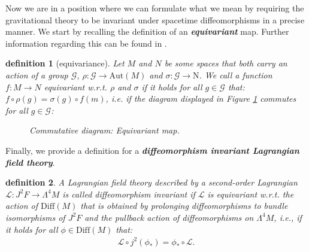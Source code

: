\documentclass[a4paper,12pt, DIV=14, BCOR=5mm, twoside, headsepline, numbers=noenddot]{scrbook}
\newtheorem{definition}{definition}[section]
\begin{document}
Now we are in a position where we can formulate what we mean by requiring the gravitational theory to be invariant under spacetime diffeomorphisms in a precise manner. We start by recalling the definition of an \textit{\textbf{equivariant}} map. Further information regarding this can be found in \cite{doi:10.1142/3867}.
\begin{definition}[equivariance]
Let $M$ and $N$ be some spaces that both carry an action of a group $\mathcal{G}$, $\rho : \mathcal{G} \rightarrow \mathrm{Aut}(M)$ and $\sigma : \mathcal{G} \rightarrow \mathrm{N}$. We call a function $f : M \rightarrow N$ equivariant w.r.t. $\rho$ and $\sigma$ if it holds for all $g \in \mathcal{G}$ that: $f \circ \rho(g) = \sigma(g) \circ f(m)$, i.e. if the diagram displayed in Figure \ref{EquiDia} commutes for all $g \in \mathcal{G}$:
\begin{figure}[hbt!]
\centering
{}
\caption{Commutative diagram: Equivariant map.}\label{EquiDia}
\end{figure}
\end{definition}
Finally, we provide a definition for a \textit{\textbf{diffeomorphism invariant Lagrangian field theory}}.
\begin{definition}
A Lagrangian field theory described by a second-order Lagrangian $\mathcal{L} : J^2F \rightarrow \Lambda^4 M$ is called diffeomorphism invariant if $\mathcal{L}$ is equivariant w.r.t. the action of $\mathrm{Diff}(M)$ that is obtained by prolonging diffeomorphisms to bundle isomorphisms of $J^2F$ and the pullback action of diffeomorphisms on $\Lambda^4M$, i.e., if it holds for all $\phi \in \mathrm{Diff}(M)$ that: 
\begin{align}
     \mathcal{L}\circ j^2(\phi_{\ast}) = \phi_{\ast} \circ \mathcal{L}.
\end{align}
\end{definition}
\end{document}
